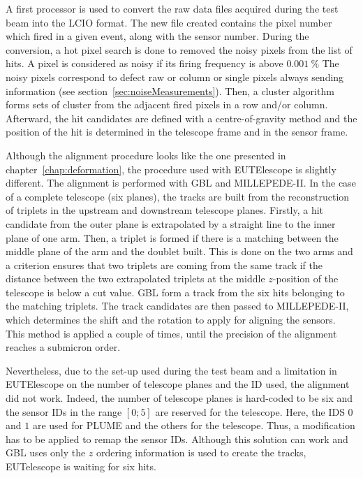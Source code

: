     A first processor is used to convert the raw data files acquired during the test beam into the LCIO format.
    The new file created contains the pixel number which fired in a given event, along with the sensor number.
    During the conversion, a hot pixel search is done to removed the noisy pixels from the list of hits.
    A pixel is considered as noisy if its firing frequency is above $0.001~\%$
    The noisy pixels correspond to defect raw or column or single pixels always sending information (see section~\ref{sec:noiseMeasurements}).
    Then, a cluster algorithm forms sets of cluster from the adjacent fired pixels in a row and/or column.
    Afterward, the hit candidates are defined with a centre-of-gravity method and the position of the hit is determined in the telescope frame and in the sensor frame.

    Although the alignment procedure looks like the one presented in chapter~\ref{chap:deformation}, the procedure used with EUTElescope is slightly different.
    The alignment is performed with \gls{GBL} and MILLEPEDE-II.
    In the case of a complete telescope (six planes), the tracks are built from the reconstruction of triplets in the upstream and downstream telescope planes.
    Firstly, a hit candidate from the outer plane is extrapolated by a straight line to the inner plane of one arm.
    Then, a triplet is formed if there is a matching between the middle plane of the arm and the doublet built.
    This is done on the two arms and a criterion ensures that two triplets are coming from the same track if the distance between the two extrapolated triplets at the middle $z$-position of the telescope is below a cut value.
    \gls{GBL} form a track from the six hits belonging to the matching triplets.
    The track candidates are then passed to MILLEPEDE-II, which determines the shift and the rotation to apply for aligning the sensors.
    This method is applied a couple of times, until the precision of the alignment reaches a submicron order.

    Nevertheless, due to the set-up used during the test beam and a limitation in EUTElescope on the number of telescope planes and the ID used, the alignment did not work.
    Indeed, the number of telescope planes is hard-coded to be six and the sensor IDs in the range $[0; 5]$ are reserved for the telescope. 
    Here, the IDS $0$ and $1$ are used for \gls{PLUME} and the others for the telescope.
    Thus, a modification has to be applied to remap the sensor IDs. 
    Although this solution can work and \gls{GBL} uses only the $z$ ordering information is used to create the tracks, EUTelescope is waiting for six hits.

